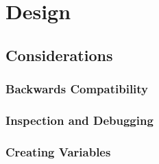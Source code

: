 \chapter{Design}\label{C:design}
%

%

\section{Considerations}

\subsection{Backwards Compatibility}

\subsection{Inspection and Debugging}

\subsection{Creating Variables}
%

